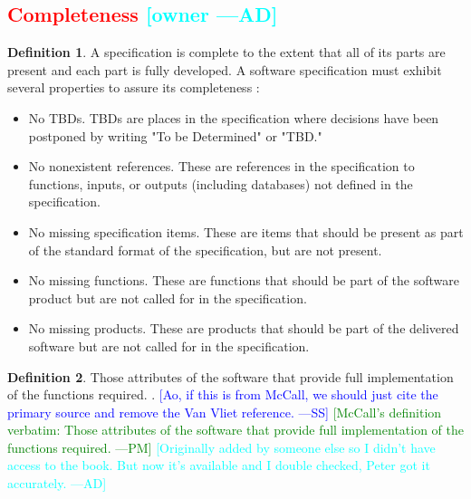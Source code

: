 \documentclass[letterpaper,cleveref]{lipics-v2019}
\newcommand{\authornote}[3]{\textcolor{#1}{[#3 ---#2]}}
\newcommand{\authornote}[3]{}
\newcommand{\wss}[1]{\authornote{blue}{SS}{#1}} %
\newcommand{\pmi}[1]{\authornote{green}{PM}{#1}} %
\newcommand{\ad}[1]{\authornote{cyan}{AD}{#1}} %
\newcommand{\notdone}[1]{\textcolor{red}{#1}}
\theoremstyle{definition}
\newtheorem{defn}{Definition}
\begin{document}
\subsection{\notdone{Completeness} \ad{owner}}

\begin{defn}
  \label{CompletenessSelected}
  A specification is complete to the extent that all of its parts are present
  and each part is fully developed. A software specification must exhibit
  several properties to assure its completeness \citep{Boehm1984}:
  \begin{itemize}
  \item No TBDs. TBDs are places in the specification where decisions have been
    postponed by writing "To be Determined" or "TBD."
  \item No nonexistent references. These are references in the specification to
    functions, inputs, or outputs (including databases) not defined in the
    specification.
  \item No missing specification items. These are items that should be present
    as part of the standard format of the specification, but are not present.
  \item No missing functions. These are functions that should be part of the
    software product but are not called for in the specification.
  \item No missing products. These are products that should be part of the
    delivered software but are not called for in the specification.
  \end{itemize}
\end{defn}

\begin{defn}
  Those attributes of the software that provide full implementation of the 
  functions required. \citep{McCallEtAl1977}. \wss{Ao, if this is from McCall, 
  we should just cite the primary source and remove the Van Vliet reference.} 
  \pmi{McCall's definition verbatim: Those attributes of the software that 
  provide full implementation of the functions required.} \ad{Originally added 
  by someone else so I didn't have access to the book. But now it's available 
  and I double checked, Peter got it accurately.}
\end{defn}
\end{document}
